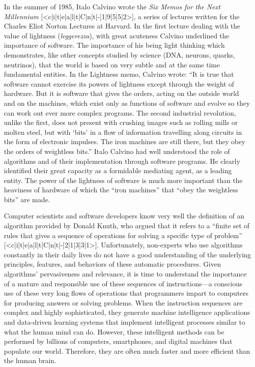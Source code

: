 In the summer of 1985, Italo Calvino wrote the \textit{Six Memos for the Next Millennium} [<c|i|t|e|a|l|t|C|n|t|-|1|9|5|5|2>], a series of lectures written for the Charles Eliot Norton Lectures at Harvard. In the first lecture dealing with the value of lightness (\textit{leggerezza}), with great acuteness Calvino underlined the importance of software. The importance of his being light thinking which demonstrates, like other concepts studied by science (DNA, neurons, quarks, neutrinos), that the world is based on very subtle and at the same time fundamental entities. In the Lightness memo, Calvino wrote: ``It is true that software cannot exercise its powers of lightness except through the weight of hardware. But it is software that gives the orders, acting on the outside world and on the machines, which exist only as functions of software and evolve so they can work out ever more complex programs. The second industrial revolution, unlike the first, does not present with crushing images such as rolling mills or molten steel, but with `bits' in a flow of information travelling along circuits in the form of electronic impulses. The iron machines are still there, but they obey the orders of weightless bits.'' Italo Calvino\vadjust{\pagebreak} had well understood the role of algorithms and of their implementation through software programs. He clearly identified their great capacity as a formidable mediating agent, as a leading entity. The power of the lightness of software is much more important than the heaviness of hardware of which the ``iron machines'' that ``obey the weightless bits'' are made.

Computer scientists and software developers know very well the definition of an algorithm provided by Donald Knuth, who argued that it refers to a ``finite set of rules that gives a sequence of operations for solving a specific type of problem'' [<c|i|t|e|a|l|t|C|n|t|-|2|1|3|3|1>]. Unfortunately, non-experts who use algorithms constantly in their daily lives do not have a good understanding of the underlying principles, features, and behaviors of these automatic procedures. Given algorithms' pervasiveness and relevance, it is time to understand the importance of a mature and responsible use of these sequences of instructions---a conscious use of these very long flows of operations that programmers impart to computers for producing answers or solving problems. When the instruction sequences are complex and highly sophisticated, they generate machine intelligence applications and data-driven learning systems that implement intelligent processes similar to what the human mind can do. However, these intelligent methods can be performed by billions of computers, smartphones, and digital machines that populate our world. Therefore, they are often much faster and more efficient than the human brain.

